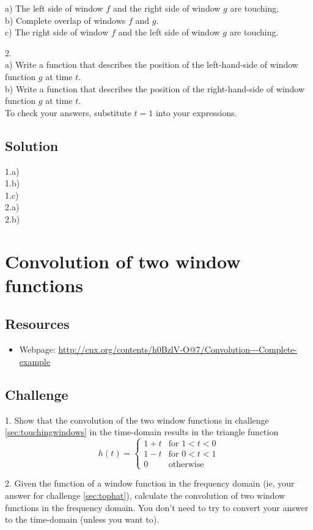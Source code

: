 a) The left side of window $f$ and the right side of window $g$ are touching.\\
b) Complete overlap of windows $f$ and $g$.\\
c) The right side of window $f$ and the left side of window $g$ are touching.

2.\\
a) Write a function that describes the position of the left-hand-side of window function $g$ at time $t$.\\
b) Write a function that describes the position of the right-hand-side of window function $g$ at time $t$.\\
To check your answers, substitute $t=1$ into your expressions.

\subsection*{Solution}
1.a) \\
1.b) \\
1.c) \\

2.a) \\
2.b) 

\timebox




\newpage
\section{Convolution of two window functions}

\subsection*{Resources}
\begin{itemize}
    \item Webpage: \url{http://cnx.org/contents/h0BzlV-O@7/Convolution---Complete-example}
\end{itemize}

\subsection*{Challenge}
1. Show that the convolution of the two window functions in challenge \ref{sec:touchingwindows} in the time-domain results in the triangle function
\begin{equation}
    h(t)=
    \begin{cases}
        1+t & \text{for } 1 < t < 0\\
        1-t & \text{for } 0 < t < 1\\
        0 & \text{otherwise}
    \end{cases}
\end{equation}

2. Given the function of a window function in the frequency domain (ie, your answer for challenge \ref{sec:tophat}), calculate the convolution of two window functions in the frequency domain. You don't need to try to convert your answer to the time-domain (unless you want to).

\timebox

\fi

